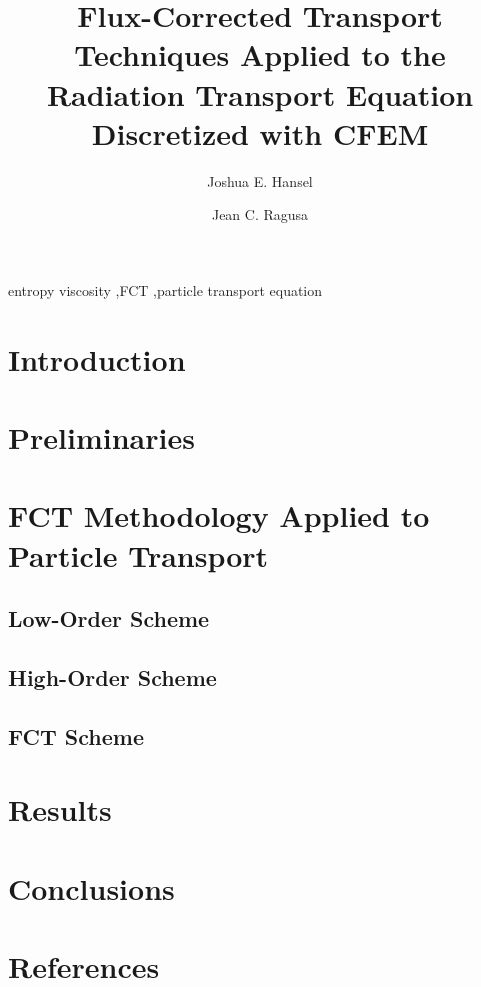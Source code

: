 \documentclass{elsarticle}
\newcommand{\tcr}[1]{\textcolor{red}{#1}}
\begin{document}
\begin{frontmatter}


\title{Flux-Corrected Transport Techniques Applied to the
	Radiation Transport Equation Discretized with CFEM}

\author[tamu]{Joshua E. Hansel}

\author[tamu]{Jean C. Ragusa}

\address[tamu]{Texas A\&M University,
  400 Bizzell St,
  College Station, TX 77840}



\begin{keyword}
entropy viscosity \sep FCT \sep particle transport equation
\end{keyword}

\end{frontmatter}

\section{Introduction\label{sec:introduction}}


\section{Preliminaries\label{sec:preliminaries}}


\section{FCT Methodology Applied to Particle Transport\label{sec:methodology}}

\subsection{Low-Order Scheme\label{sec:low}}

\subsection{High-Order Scheme\label{sec:high}}

\subsection{FCT Scheme\label{sec:fct}}


\section{Results\label{sec:results}}


\section{Conclusions\label{sec:conclusions}}


\section*{References}


\end{document}
